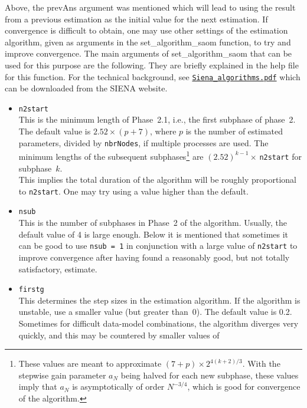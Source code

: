 \documentclass[a4paper,fleqn,11pt]{article}
\newcommand{\+}{\, + \,}
\newcommand{\sfn}[1]{\textsf{#1}}
\newcommand{\SI}{{\sf SIENA }}
\begin{document}
Above, the \sfn{prevAns} argument was mentioned which will
lead to using the result from a previous estimation as the initial
value for the next estimation.
If convergence is difficult to obtain, one may use other
settings of the estimation algorithm, given as
arguments in the \sfn{set\_algorithm\_saom} function, to try and
improve convergence.
The main arguments of \sfn{set\_algorithm\_saom} that can be used
for this purpose are the following.
They are briefly explained in the help file for this function.
For the technical background, see
\href{http://www.stats.ox.ac.uk/~snijders/siena/Siena_algorithms.pdf}{\texttt{Siena\_algorithms.pdf}}
which can be downloaded from the \SI website.

\begin{itemize}
\item \texttt{n2start}\\
    This is the minimum length of Phase~2.1, i.e., the first subphase of phase~2.
    The default value
     is $2.52\times (p+7)$, where $p$ is the number of estimated parameters,
     divided by \texttt{nbrNodes}, if multiple processes are used.
    The minimum lengths of the subsequent subphases\footnote{These values are
     meant to approximate $(7+p)\times 2^{4(k+2)/3}$.
    With the stepwise gain parameter $a_N$ being halved
    for each new subphase, these values
    imply that $a_N$ is asymptotically of order $N^{-3/4}$, which is
    good for convergence of the algorithm.}
    are $(2.52)^{k-1} \times\,$\texttt{n2start} for subphase~$k$.\\
    This implies the total duration of the algorithm will be roughly proportional to
    \texttt{n2start}. One may try using a value higher than the default.
\item \texttt{nsub}\\
    This is the number of subphases in Phase~2 of the algorithm.
    Usually, the default value of 4 is large enough. Below it is mentioned
    that sometimes it can be good to use \texttt{nsub~=~1} in conjunction
    with a large value of \texttt{n2start} to improve convergence
    after having found a reasonably good, but not totally satisfactory,
    estimate.
\item \texttt{firstg}\\
    This determines the step sizes in the estimation algorithm. If the algorithm is unstable,
    use a smaller value (but greater than~0).
    The default value is 0.2.
    Sometimes for difficult data-model combinations, the algorithm
    diverges very quickly, and this may be countered by smaller values of

\end{itemize}
\end{document}
